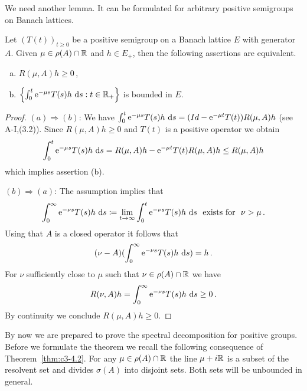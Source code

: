 We need another lemma. It can be formulated for arbitrary positive
semigroups on Banach lattices.

\begin{lemma}\label{lem:c3-4.7}
Let $(T(t))_{t \geq 0}$ be a positive semigroup on a Banach
lattice $E$ with generator $A$. Given $\mu \in \rho(A) \cap \mathbb{R} $ and $h \in E_+$, then the following assertions are equivalent.
\begin{enumerate}[(a)]
	\item 
	$R(\mu,A)h \geq 0$\,,

	\item 
	$\left\{\int_{0}^{t} \mathrm{e}^{-\mu s}T(s)h \, \mathop{}\!\mathrm{d}{s} : t \in \mathbb{R} _+\right\}$ is bounded in $E$.
\end{enumerate}
\end{lemma}

\begin{proof}
$(a)\Rightarrow(b)$: We have
$\int_{0}^{t} \mathrm{e}^{-\mu s}T(s)h \, \mathop{}\!\mathrm{d}{s} = (Id - \mathrm{e}^{-\mu t}T(t))R(\mu,A)h$ (see A-I,(3.2)).
Since $R(\mu,A)h \geq 0$ and $T(t)$ is a positive operator we obtain
\[
\int_{0}^{t} \mathrm{e}^{-\mu s}T(s)h \, \mathop{}\!\mathrm{d}{s} = R(\mu,A)h - \mathrm{e}^{-\mu t}T(t)R(\mu,A)h \leq R(\mu,A)h
\] 
which implies assertion (b).

$(b)\Rightarrow(a)$: The assumption implies that 
\[
\int_{0}^{\infty} \mathrm{e}^{-\nu s}T(s)h \, \ds \coloneqq 
\lim_{t \to \infty} \int_{0}^{t} \mathrm{e}^{-\nu s}T(s)h \, \ds \ \text{ exists for } \ \nu > \mu\,. 
\]
Using that $A$ is a closed operator it follows that 
\[
(\nu - A)(\int_{0}^{\infty} \mathrm{e}^{-\nu s}T(s)h \, \mathop{}\!\mathrm{d}{s}) = h\,.
\]
For $\nu$
sufficiently close to $\mu$ such that $\nu \in \rho(A) \cap \mathbb{R} $ we have 
\[ 
R(\nu,A)h = \int_{0}^{\infty} \mathrm{e}^{-\nu s}T(s)h \, \mathop{}\!\mathrm{d}{s} \geq 0\,. 
\] 
By continuity we conclude $R(\mu,A)h \geq 0$.
\end{proof}

By now we are prepared to prove the spectral decomposition for positive groups. Before we formulate the theorem we recall the following
consequence of Theorem~\ref{thm:c3-4.2}. For any $\mu \in \rho(A) \cap \mathbb{R} $ the line $\mu+i\mathbb{R} $ is a
subset of the resolvent set and divides $\sigma(A)$ into disjoint sets.
Both sets will be unbounded in general.

